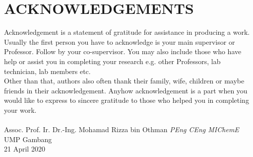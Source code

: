 \chapter{ACKNOWLEDGEMENTS}

\begin{singlespace}
\noindent
Acknowledgement is a statement of gratitude for assistance in producing a work. Usually the first person you have to acknowledge is your main supervisor or Professor. Follow by your co-supervisor. You may also include those who have help or assist you in completing your research e.g. other Professors, lab technician, lab members etc.\\

\noindent
Other than that, authors also often thank their family, wife, children or maybe friends in their acknowledgement. Anyhow acknowledgement is a part when you would like to express to sincere gratitude to those who helped you in completing your work.
\\
\\
Assoc. Prof. Ir. Dr.-Ing. Mohamad Rizza bin Othman \textit{PEng CEng MIChemE}\\
UMP Gambang\\
21 April 2020
\end{singlespace}

